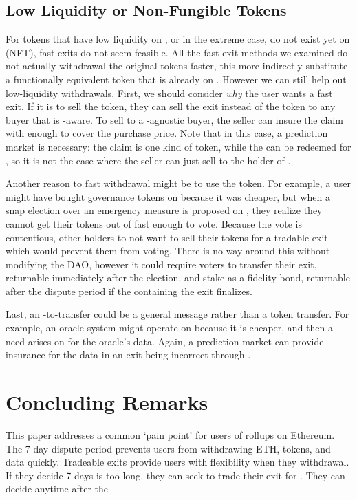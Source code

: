 \subsection{Low Liquidity or Non-Fungible Tokens}

For tokens that have low liquidity on \layerone, or in the extreme case, do not exist yet on \layerone (\eg NFT), fast exits do not seem feasible. All the fast exit methods we examined do not actually withdrawal the original tokens faster, this more indirectly substitute a functionally equivalent token that is already on \layerone. However we can still help out low-liquidity withdrawals. First, we should consider \textit{why} the user wants a fast exit. If it is to sell the token, they can sell the exit instead of the token to any buyer that is \layertwo-aware. To sell to a \layertwo-agnostic buyer, the seller can insure the claim with enough \fail to cover the purchase price. Note that in this case, a prediction market is necessary: the claim is one kind of token, while the \fail can be redeemed for \ethone, so it is not the case where the seller can just sell to the holder of \final.

Another reason to fast withdrawal might be to use the token. For example, a user might have bought governance tokens on \layertwo because it was cheaper, but when a snap election over an emergency measure is proposed on \layerone, they realize they cannot get their tokens out of \layertwo fast enough to vote. Because the vote is contentious, other holders to not want to sell their tokens for a tradable exit which would prevent them from voting. There is no way around this without modifying the DAO, however it could require voters to transfer their exit, returnable immediately after the election, and stake \ethone as a fidelity bond, returnable after the dispute period if the \rblock containing the exit finalizes.

Last, an \layertwo-to-\layerone transfer could be a general message rather than a token transfer. For example, an oracle system might operate on \layertwo because it is cheaper, and then a need arises on \layerone for the oracle's data. Again, a prediction market can provide insurance for the data in an exit being incorrect through \fail.


\section{Concluding Remarks}

This paper addresses a common `pain point' for users of \layertwo rollups on Ethereum. The 7 day dispute period prevents users from withdrawing ETH, tokens, and data quickly. Tradeable exits provide users with flexibility when they withdrawal. If they decide 7 days is too long, they can seek to trade their exit for \ethone. They can decide anytime after the 





